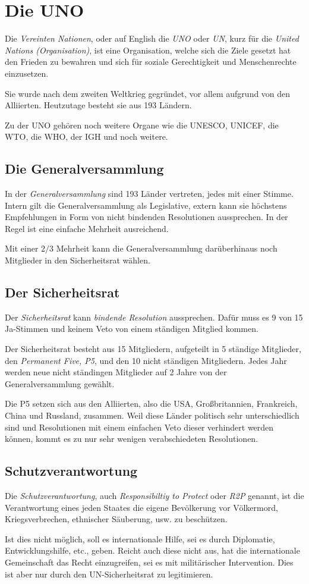 \documentclass{article}
\begin{document}
\section{Die UNO}
Die \emph{Vereinten Nationen}, oder auf English die \emph{UNO} oder \emph{UN}, kurz für die \emph{United Nations (Organisation)}, ist eine Organisation, welche sich die Ziele gesetzt hat den Frieden zu bewahren und sich für soziale Gerechtigkeit und Menschenrechte einzusetzen.
 
Sie wurde nach dem zweiten Weltkrieg gegründet, vor allem aufgrund von den Alliierten. Heutzutage besteht sie aus 193 Ländern. 
 
Zu der UNO gehören noch weitere Organe wie die UNESCO, UNICEF, die WTO, die WHO, der IGH und noch weitere.
 
\subsection{Die Generalversammlung}
In der \emph{Generalversammlung} sind 193 Länder vertreten, jedes mit einer Stimme. Intern gilt die Generalversammlung als Legislative, extern kann sie höchstens Empfehlungen in Form von nicht bindenden Resolutionen aussprechen. In der Regel ist eine einfache Mehrheit ausreichend.
 
Mit einer $2/3$ Mehrheit kann die Generalversammlung darüberhinaus noch Mitglieder in den Sicherheitsrat wählen. 
 
\subsection{Der Sicherheitsrat}
Der \emph{Sicherheitsrat} kann \emph{bindende Resolution} aussprechen. Dafür muss es 9 von 15 Ja-Stimmen und keinem Veto von einem ständigen Mitglied kommen.
 
Der Sicherheitsrat besteht aus 15 Mitgliedern, aufgeteilt in 5 ständige Mitglieder, den \emph{Permanent Five, P5}, und den 10 nicht ständigen Mitgliedern. Jedes Jahr werden neue nicht ständingen Mitglieder auf 2 Jahre von der Generalversammlung gewählt.
 
Die P5 setzen sich aus den Alliierten, also die USA, Großbritannien, Frankreich, China und Russland, zusammen. Weil diese Länder politisch sehr unterschiedlich sind und Resolutionen mit einem einfachen Veto dieser verhindert werden können, kommt es zu nur sehr wenigen verabschiedeten Resolutionen.
 
\subsection{Schutzverantwortung}
Die \emph{Schutzverantwortung}, auch \emph{Responsibiltiy to Protect} oder \emph{R2P} genannt, ist die Verantwortung eines jeden Staates die eigene Bevölkerung vor Völkermord, Kriegsverbrechen, ethnischer Säuberung, usw. zu beschützen.
 
Ist dies nicht möglich, soll es internationale Hilfe, sei es durch Diplomatie, Entwicklungshilfe, etc., geben. Reicht auch diese nicht aus, hat die internationale Gemeinschaft das Recht einzugreifen, sei es mit militärischer Intervention. Dies ist aber nur durch den UN-Sicherheitsrat zu legitimieren.
\end{document}
